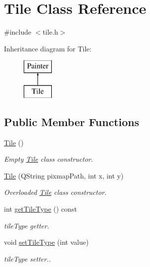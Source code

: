 \hypertarget{class_tile}{}\section{Tile Class Reference}
\label{class_tile}


{\ttfamily \#include $<$tile.\+h$>$}

Inheritance diagram for Tile\+:\begin{figure}[H]
\begin{center}
\leavevmode
\includegraphics[height=2.000000cm]{class_tile}
\end{center}
\end{figure}
\subsection*{Public Member Functions}
\begin{DoxyCompactItemize}
\item 
\mbox{\hyperlink{class_tile_aeeb5593bb6b75aae2edfcccbc84ab378}{Tile}} ()
\begin{DoxyCompactList}\small\item\em Empty \mbox{\hyperlink{class_tile}{Tile}} class constructor. \end{DoxyCompactList}\item 
\mbox{\hyperlink{class_tile_ab295fb34dca1d8e0b4bf8a3d37ddfbad}{Tile}} (Q\+String pixmap\+Path, int x, int y)
\begin{DoxyCompactList}\small\item\em Overloaded \mbox{\hyperlink{class_tile}{Tile}} class constructor. \end{DoxyCompactList}\item 
\mbox{\label{class_tile_a6ae2b82877df3597bec59d3bc99f0f25}} 
int \mbox{\hyperlink{class_tile_a6ae2b82877df3597bec59d3bc99f0f25}{get\+Tile\+Type}} () const
\begin{DoxyCompactList}\small\item\em tile\+Type getter. \end{DoxyCompactList}\item 
\mbox{\label{class_tile_a987377bd877d64a1d4827638efdd7bfa}} 
void \mbox{\hyperlink{class_tile_a987377bd877d64a1d4827638efdd7bfa}{set\+Tile\+Type}} (int value)
\begin{DoxyCompactList}\small\item\em tile\+Type setter.. \end{DoxyCompactList}\end{DoxyCompactItemize}
